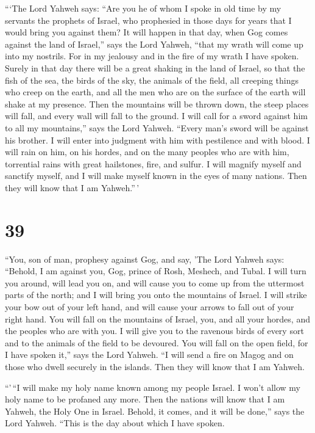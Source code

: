  ```The Lord Yahweh says: ``Are you he of whom I spoke in
old time by my servants the prophets of Israel, who prophesied in those
days for years that I would bring you against them?  It
will happen in that day, when Gog comes against the land of Israel,''
says the Lord Yahweh, ``that my wrath will come up into my nostrils.
 For in my jealousy and in the fire of my wrath I have
spoken. Surely in that day there will be a great shaking in the land of
Israel,  so that the fish of the sea, the birds of the
sky, the animals of the field, all creeping things who creep on the
earth, and all the men who are on the surface of the earth will shake at
my presence. Then the mountains will be thrown down, the steep places
will fall, and every wall will fall to the ground.  I
will call for a sword against him to all my mountains,'' says the Lord
Yahweh. ``Every man's sword will be against his brother. 
I will enter into judgment with him with pestilence and with blood. I
will rain on him, on his hordes, and on the many peoples who are with
him, torrential rains with great hailstones, fire, and sulfur.
 I will magnify myself and sanctify myself, and I will
make myself known in the eyes of many nations. Then they will know that
I am Yahweh.''\,'

\hypertarget{section-37}{%
\section{39}\label{section-37}}

 ``You, son of man, prophesy against Gog, and say, 'The
Lord Yahweh says: ``Behold, I am against you, Gog, prince of Rosh,
Meshech, and Tubal.  I will turn you around, will lead you
on, and will cause you to come up from the uttermost parts of the north;
and I will bring you onto the mountains of Israel.  I will
strike your bow out of your left hand, and will cause your arrows to
fall out of your right hand.  You will fall on the
mountains of Israel, you, and all your hordes, and the peoples who are
with you. I will give you to the ravenous birds of every sort and to the
animals of the field to be devoured.  You will fall on the
open field, for I have spoken it,'' says the Lord Yahweh. 
``I will send a fire on Magog and on those who dwell securely in the
islands. Then they will know that I am Yahweh.

 ``'\,``I will make my holy name known among my people
Israel. I won't allow my holy name to be profaned any more. Then the
nations will know that I am Yahweh, the Holy One in Israel.
 Behold, it comes, and it will be done,'' says the Lord
Yahweh. ``This is the day about which I have spoken.

